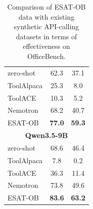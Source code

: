\begin{table}[t!]
\begin{tabular}[b]{lcc}
\midrule
zero-shot   & 62.3 & 37.1 \\
ToolAlpaca  & 25.3 & \phantom{0}8.0 \\
ToolACE     & 10.3 & \phantom{0}5.2 \\
Nemotron    & 68.2 & 40.7 \\
\midrule
ESAT-OB     & \bf 77.0 & \bf 59.3 \\
\midrule
\multicolumn{3}{c}{\bf Qwen3.5-9B}\\
\midrule
zero-shot   & 68.6 & 46.4 \\
ToolAlpaca  & \phantom{0}7.8 & \phantom{0}0.2 \\
ToolACE     & 36.3 & 11.4 \\
Nemotron    & 73.8 & 49.6 \\
\midrule
ESAT-OB     & \bf 83.6 & \bf 63.2 \\
\bottomrule
\end{tabular}
\caption{Comparison of ESAT-OB data with existing synthetic API-calling datasets in terms of effectiveness on OfficeBench.}
\label{tab:officebench_baseline_comparison}
\end{table}
